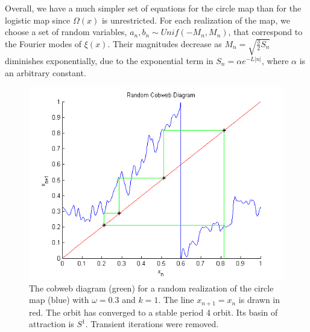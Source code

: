 Overall, we have a much simpler set of equations for the circle map
than for the logistic map since $\Omega(x)$ is unrestricted. For each realization of the map, we choose
a set of random variables, $a_n, b_n \sim Unif(-M_n,M_n)$, that
correspond to the Fourier modes of $\xi(x)$. Their magnitudes decrease
as $M_n=\sqrt{\frac{3}{2}S_n}$ diminishes exponentially, due to the
exponential term in $S_n=\alpha e^{-L|n|}$, where $\alpha$ is an arbitrary
constant. 
\begin{figure}[!h]
\caption[Random circle map, stable orbit]{The cobweb
  diagram (green) for a random realization of the circle map (blue) with $\omega =
  0.3$ and $k=1$. The line $x_{n+1}=x_n$ is drawn in red. The orbit
  has converged to a stable period 4 orbit. Its basin of attraction is
  $S^1$. Transient iterations were removed.}\label{fig:rcircstable}
	\begin{center}
		\includegraphics[scale=0.7]{figs/randcirc_cobweb.png}
	\end{center}
\end{figure}





